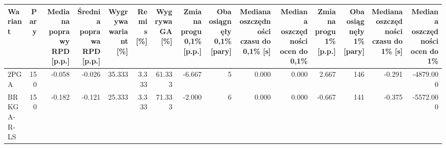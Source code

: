 \begin{tabular}{lrrrrrrrrrrrrrr}
\toprule
Wariant & Pary & Mediana poprawy RPD [p.p.] & Średnia poprawa RPD [p.p.] & Wygrywa wariant [\%] & Remis [\%] & Wygrywa GA [\%] & Zmiana progu 0,1\% [p.p.] & Oba osiągnęły 0,1\% [pary] & Mediana oszczędności czasu do 0,1\% [s] & Mediana oszczędności ocen do 0,1\% & Zmiana progu 1\% [p.p.] & Oba osiągnęły 1\% [pary] & Mediana oszczędności czasu do 1\% [s] & Mediana oszczędności ocen do 1\% \\
\midrule
2PGA & 150 & -0.058 & -0.026 & 35.333 & 3.333 & 61.333 & -6.667 & 5 & 0.000 & 0.000 & 2.667 & 146 & -0.291 & -4879.000 \\
BRKGA-R-LS & 150 & -0.182 & -0.121 & 25.333 & 3.333 & 71.333 & -2.000 & 6 & 0.000 & 0.000 & -0.667 & 141 & -0.375 & -5572.000 \\
\bottomrule
\end{tabular}
